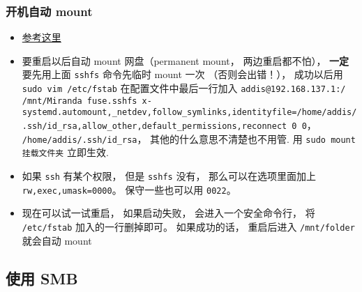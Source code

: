 \subsubsection{开机自动 mount}
\begin{itemize}
\item \href{https://www.linode.com/docs/networking/ssh/using-sshfs-on-linux/}{参考这里}
\item 要重启以后自动 mount 网盘（permanent mount， 两边重启都不怕）， \textbf{一定}要先用上面 \verb`sshfs` 命令先临时 mount 一次 （否则会出错！）， 成功以后用 \verb`sudo vim /etc/fstab` 在配置文件中最后一行加入 \verb`addis@192.168.137.1:/ /mnt/Miranda fuse.sshfs x-systemd.automount,_netdev,follow_symlinks,identityfile=/home/addis/.ssh/id_rsa,allow_other,default_permissions,reconnect 0 0`， \verb`/home/addis/.ssh/id_rsa`， 其他的什么意思不清楚也不用管. 用 \verb`sudo mount 挂载文件夹` 立即生效.
\item 如果 \verb|ssh| 有某个权限， 但是 \verb|sshfs| 没有， 那么可以在选项里面加上 \verb|rw,exec,umask=0000|。 保守一些也可以用 \verb|0022|。
\item 现在可以试一试重启， 如果启动失败， 会进入一个安全命令行， 将 \verb`/etc/fstab` 加入的一行删掉即可。 如果成功的话， 重启后进入 \verb`/mnt/folder` 就会自动 mount
\end{itemize}

\subsection{使用 SMB}
